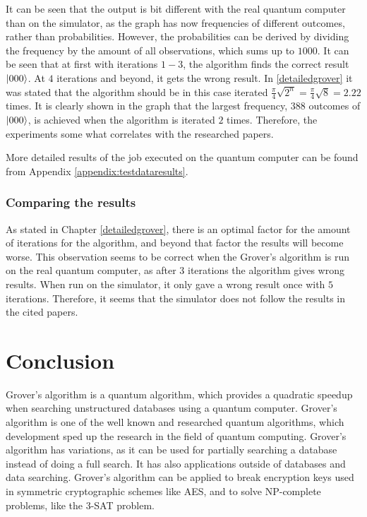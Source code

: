 \documentclass[english,oneside,openright]{UH_DS_report}
\begin{document}
It can be seen that the output is bit different with the real quantum computer than on the simulator, as the graph has now frequencies of different outcomes, rather than probabilities. However, the probabilities can be derived by dividing the frequency by the amount of all observations, which sums up to $1000$. It can be seen that at first with iterations $1 - 3$, the algorithm finds the correct result $\ket{000}$. At $4$ iterations and beyond, it gets the wrong result. In \ref{detailedgrover} it was stated that the algorithm should be in this case iterated $\frac{\pi}{4} \sqrt{2^{n}} = \frac{\pi}{4} \sqrt{8} = 2.22 $ times. It is clearly shown in the graph that the largest frequency, $388$ outcomes of $\ket{000}$, is achieved when the algorithm is iterated $2$ times. Therefore, the experiments some what correlates with the researched papers.

More detailed results of the job executed on the quantum computer can be found from Appendix \ref{appendix:testdataresults}.

\subsection{Comparing the results}
As stated in Chapter \ref{detailedgrover}, there is an optimal factor for the amount of iterations for the algorithm, and beyond that factor the results will become worse. This observation seems to be correct when the Grover's algorithm is run on the real quantum computer, as after $3$ iterations the algorithm gives wrong results. When run on the simulator, it only gave a wrong result once with $5$ iterations. Therefore, it seems that the simulator does not follow the results in the cited papers.

\chapter{Conclusion}
\label{chpater:conclusion}

Grover's algorithm is a quantum algorithm, which provides a quadratic speedup when searching unstructured databases using a quantum computer. Grover's algorithm is one of the well known and researched quantum algorithms, which development sped up the research in the field of quantum computing. Grover's algorithm has variations, as it can be used for partially searching a database instead of doing a full search. It has also applications outside of databases and data searching. Grover's algorithm can be applied to break encryption keys used in symmetric cryptographic schemes like AES, and to solve NP-complete problems, like the 3-SAT problem.
\end{document}
